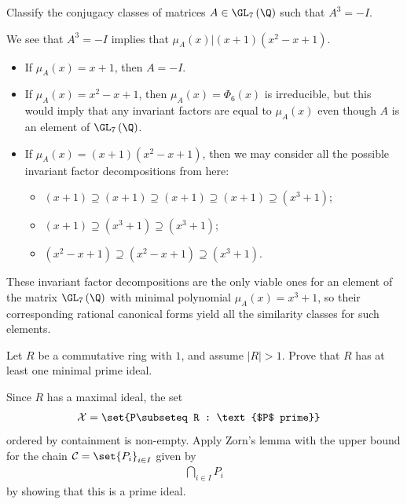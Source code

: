\documentclass[10pt]{mypackage}
\begin{document}
\begin{problem}[Problem 2]
  Classify the conjugacy classes of matrices $A\in \GL_7\left( \Q \right)$ such that $A^3 = -I$.
\end{problem}
\begin{solution}
  We see that $A^3 = -I$ implies that $\mu_A(x) | \left( x+1 \right)\left( x^2-x+1 \right)$. 
  \begin{itemize}
    \item If $\mu_A(x) = x + 1$, then $A = -I$.
    \item If $\mu_A(x) = x^2 - x + 1$, then $\mu_A(x) = \Phi_6(x)$ is irreducible, but this would imply that any invariant factors are equal to $\mu_A(x)$ even though $A$ is an element of $\GL_7\left( \Q \right)$.
    \item If $\mu_A(x) = \left( x+1 \right)\left( x^2-x+1 \right)$, then we may consider all the possible invariant factor decompositions from here:
      \begin{itemize}
        \item $\left( x+1 \right)\supseteq \left( x+1 \right)\supseteq \left( x+1 \right)\supseteq \left( x+1 \right)\supseteq \left( x^3 + 1 \right)$;
        \item $\left( x+1 \right)\supseteq \left( x^3 + 1 \right)\supseteq \left( x^3 + 1 \right)$;
        \item $\left( x^2-x+1 \right)\supseteq \left( x^2-x+1 \right)\supseteq \left( x^3 + 1 \right)$.
      \end{itemize}
  \end{itemize}
  These invariant factor decompositions are the only viable ones for an element of the matrix $\GL_7\left( \Q \right)$ with minimal polynomial $\mu_A(x) = x^3 + 1$, so their corresponding rational canonical forms yield all the similarity classes for such elements.
\end{solution}
\begin{problem}[Problem 3]
  Let $R$ be a commutative ring with $1$, and assume $\left\vert R \right\vert > 1$. Prove that $R$ has at least one minimal prime ideal.
\end{problem}
\begin{solution}
  Since $R$ has a maximal ideal, the set
  \begin{align*}
    \mathcal{X} &= \set{P\subseteq R : \text{$P$ prime}}
  \end{align*}
  ordered by containment is non-empty. Apply Zorn's lemma with the upper bound for the chain $\mathcal{C} = \set{P_i}_{i\in I}$ given by
  \begin{align*}
    \bigcap_{i\in I}P_i
  \end{align*}
  by showing that this is a prime ideal.
\end{solution}
\end{document}
